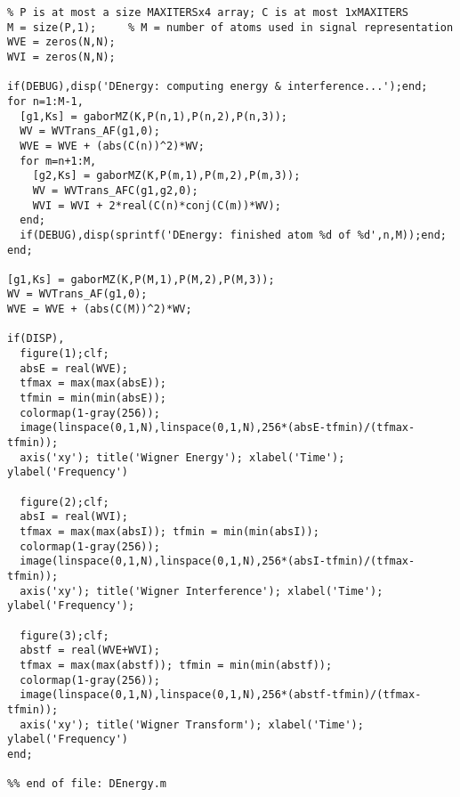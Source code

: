 \begin{verbatim}
% P is at most a size MAXITERSx4 array; C is at most 1xMAXITERS
M = size(P,1);     % M = number of atoms used in signal representation
WVE = zeros(N,N);
WVI = zeros(N,N);

if(DEBUG),disp('DEnergy: computing energy & interference...');end;
for n=1:M-1,
  [g1,Ks] = gaborMZ(K,P(n,1),P(n,2),P(n,3));
  WV = WVTrans_AF(g1,0);
  WVE = WVE + (abs(C(n))^2)*WV;
  for m=n+1:M,
    [g2,Ks] = gaborMZ(K,P(m,1),P(m,2),P(m,3));
    WV = WVTrans_AFC(g1,g2,0);
    WVI = WVI + 2*real(C(n)*conj(C(m))*WV);
  end;
  if(DEBUG),disp(sprintf('DEnergy: finished atom %d of %d',n,M));end;
end;

[g1,Ks] = gaborMZ(K,P(M,1),P(M,2),P(M,3));
WV = WVTrans_AF(g1,0);
WVE = WVE + (abs(C(M))^2)*WV;

if(DISP),
  figure(1);clf;
  absE = real(WVE);
  tfmax = max(max(absE));
  tfmin = min(min(absE));
  colormap(1-gray(256));
  image(linspace(0,1,N),linspace(0,1,N),256*(absE-tfmin)/(tfmax-tfmin));
  axis('xy'); title('Wigner Energy'); xlabel('Time'); ylabel('Frequency')

  figure(2);clf;
  absI = real(WVI);
  tfmax = max(max(absI)); tfmin = min(min(absI));
  colormap(1-gray(256));
  image(linspace(0,1,N),linspace(0,1,N),256*(absI-tfmin)/(tfmax-tfmin));
  axis('xy'); title('Wigner Interference'); xlabel('Time'); ylabel('Frequency');

  figure(3);clf;  
  abstf = real(WVE+WVI);
  tfmax = max(max(abstf)); tfmin = min(min(abstf));
  colormap(1-gray(256));
  image(linspace(0,1,N),linspace(0,1,N),256*(abstf-tfmin)/(tfmax-tfmin));
  axis('xy'); title('Wigner Transform'); xlabel('Time'); ylabel('Frequency')
end;

%% end of file: DEnergy.m
\end{verbatim}

